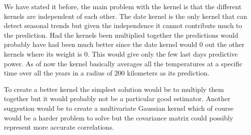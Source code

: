 \documentclass[10pt]{article}
\begin{document}
We have stated it before, the main problem with the kernel is that the different kernels are independent of each other.
The date kernel is the only kernel that can detect seasonal trends but given the independence it cannot contribute much
to the prediction. Had the kernels been multiplied together the predictions would probably have had been much better
since the date kernel would 0 out the other kernels where its weight is 0. This would give only the few last days
predictive power. As of now the kernel basically averages all the temperatures at a specific time over all the years
in a radius of 200 kilometers as its prediction.

To create a better kernel the simplest solution would be to multiply them together but it would probably not be a particular
good estimator. Another suggestion would be to create a multivariate Gaussian kernel which of course would be a harder
problem to solve but the covariance matrix could possibly represent more accurate correlations.
\end{document}
